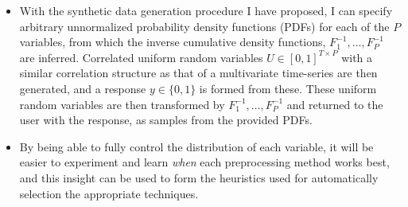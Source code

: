 \documentclass[portrait,final,x11names,a1paper,fontscale=0.4]{baposter}
\newcommand{\icl}[1]{{\bf\color{blue_icl2}{#1}}}
\renewcommand{\vec}[1]{\boldsymbol{#1}}
\newcommand{\mvec}[1]{\mathbf{#1}}
\begin{document}
\begin{poster}
{    \noindent
\begin{itemize}[leftmargin=.15in]
\item 
With the synthetic data generation procedure I have proposed, I can specify arbitrary unnormalized probability density functions (PDFs) for each of the $P$ variables, from which the inverse cumulative
density functions, $F^{-1}_1,\dots,F^{-1}_P$ are inferred. Correlated uniform random variables
$U \in [0,1]^{T \times P}$
with a similar correlation structure as that of a multivariate time-series are then generated,
and a response $y \in \{0,1\}$ is formed from these. These uniform random variables are then
transformed by $F^{-1}_1,\dots,F^{-1}_P$ and returned to the user with the response, as samples from the provided PDFs.
\item  By being able to fully control the distribution of each variable, it will be easier to experiment and learn \textit{when} each preprocessing method works best, and this insight can be used to
    form the heuristics used for automatically selection the appropriate techniques.
\end{itemize}


}

%


\end{poster}
\end{document}
